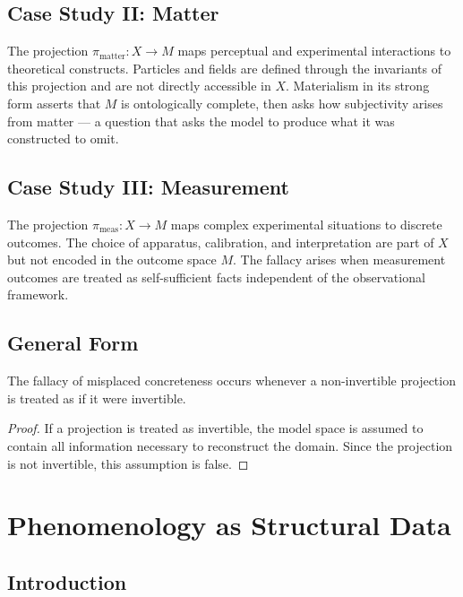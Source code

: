 \documentclass[11pt,openany]{book}
\begin{document}
\section{Case Study II: Matter}
\label{sec:matter}

The projection $\pi_{\mathrm{matter}} : X \to M$ maps
perceptual and experimental interactions to theoretical
constructs. Particles and fields are defined through the
invariants of this projection and are not directly
accessible in $X$. Materialism in its strong form asserts
that $M$ is ontologically complete, then asks how
subjectivity arises from matter --- a question that asks
the model to produce what it was constructed to omit.

\section{Case Study III: Measurement}
\label{sec:measurement}

The projection $\pi_{\mathrm{meas}} : X \to M$ maps
complex experimental situations to discrete outcomes. The
choice of apparatus, calibration, and interpretation are
part of $X$ but not encoded in the outcome space $M$. The
fallacy arises when measurement outcomes are treated as
self-sufficient facts independent of the observational
framework.

\section{General Form}
\label{sec:unified}

\begin{proposition}
The fallacy of misplaced concreteness occurs whenever a
non-invertible projection is treated as if it were
invertible.
\end{proposition}

\begin{proof}
If a projection is treated as invertible, the model space
is assumed to contain all information necessary to
reconstruct the domain. Since the projection is not
invertible, this assumption is false.
\end{proof}


\chapter{Phenomenology as Structural Data}
\label{ch:phenomenology}

\section{Introduction}
\label{sec:introduction-phenomenology}
\end{document}
